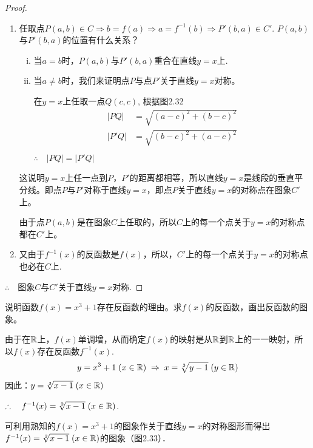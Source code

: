 \begin{proof}
\begin{enumerate}[(1)]
    \item 任取点$P(a,b)\in C\Longrightarrow b=f(a)\Longrightarrow a=f^{-1}(b)\Longrightarrow P'(b,a)\in C'$. $P(a,b)$与$P'(b,a)$的位置有什么关系？
\begin{enumerate}[(i)]
    \item 当$a=b$时，$P(a,b)$与$P'(b,a)$重合在直线$y=x$上.
    \item 当$a\ne b$时，我们来证明点$P$与点$P'$关于直线$y=x$对称。
    
    在$y=x$上任取一点$Q(c,c)$, 根据图2.32
\[\begin{split}
    |PQ|&=\sqrt{(a-c)^2+(b-c)^2}\\
    |P'Q|&=\sqrt{(b-c)^2+(a-c)^2}\\
\end{split}\]
$\therefore\quad |PQ|=|P'Q|$
\end{enumerate}

\begin{figure}[htp]
    \centering
{}
    \caption{}
\end{figure}


这说明$y=x$上任一点到$P$，$P'$的距离都相等，所以直线$y=x$是线段的垂直平分线。即点$P$与$P'$对称于直线$y=x$，即点$P$关于直线$y=x$的对称点在图象$C'$上。

由于点$P(a,b)$是在图象$C$上任取的，所以$C$上的每一个点关于$y=x$的对称点都在$C'$上。

\item 又由于$f^{-1}(x)$的反函数是$f(x)$，所以，$C'$上的每一个点关于$y=x$的对称点也必在$C$上.
\end{enumerate}

$\therefore\quad $图象$C$与$C'$关于直线$y=x$对称.
\end{proof}

\begin{example}
说明函数$f(x)=x^3+1$存在反函数的理由。求$f(x)$的反函数，画出反函数的图象。   
\end{example}

\begin{solution}
由于在$\mathbb{R}$上，$f(x)$单调增，从而确定$f(x)$的映射是从$\mathbb{R}$到$\mathbb{R}$上的一一映射，所以$f(x)$存在反函数$f^{-1}(x)$.
\[y=x^3+1\; (x\in\mathbb{R})\;\Rightarrow\; x=\sqrt[3]{y-1}\; (y\in\mathbb{R})\]
因此：$y=\sqrt[3]{x-1}\; (x\in\mathbb{R})$

$\therefore\quad f^{-1}(x)=\sqrt[2]{x-1}\; (x\in\mathbb{R})$.

可利用熟知的$f(x)=x^3+1$的图象作关于直线$y=x$的对称图形而得出$f^{-1}(x)= \sqrt[2]{x-1}\; (x\in\mathbb{R})$的图象（图2.33）．
\end{solution}    

